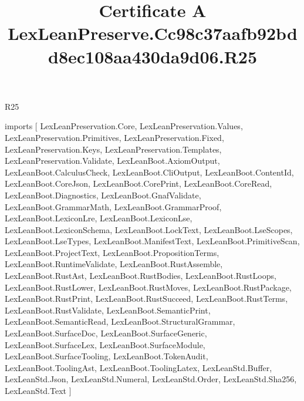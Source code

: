 \begin{lexlean}{R25}
\title{Certificate A LexLeanPreserve.Cc98c37aafb92bdd8ec108aa430da9d06.R25}
\begin{coremodule}
imports [
  LexLeanPreservation.Core,
  LexLeanPreservation.Values,
  LexLeanPreservation.Primitives,
  LexLeanPreservation.Fixed,
  LexLeanPreservation.Keys,
  LexLeanPreservation.Templates,
  LexLeanPreservation.Validate,
  LexLeanBoot.AxiomOutput,
  LexLeanBoot.CalculusCheck,
  LexLeanBoot.CliOutput,
  LexLeanBoot.ContentId,
  LexLeanBoot.CoreJson,
  LexLeanBoot.CorePrint,
  LexLeanBoot.CoreRead,
  LexLeanBoot.Diagnostics,
  LexLeanBoot.GnafValidate,
  LexLeanBoot.GrammarMath,
  LexLeanBoot.GrammarProof,
  LexLeanBoot.LexiconLre,
  LexLeanBoot.LexiconLse,
  LexLeanBoot.LexiconSchema,
  LexLeanBoot.LockText,
  LexLeanBoot.LseScopes,
  LexLeanBoot.LseTypes,
  LexLeanBoot.ManifestText,
  LexLeanBoot.PrimitiveScan,
  LexLeanBoot.ProjectText,
  LexLeanBoot.PropositionTerms,
  LexLeanBoot.RuntimeValidate,
  LexLeanBoot.RustAssemble,
  LexLeanBoot.RustAst,
  LexLeanBoot.RustBodies,
  LexLeanBoot.RustLoops,
  LexLeanBoot.RustLower,
  LexLeanBoot.RustMoves,
  LexLeanBoot.RustPackage,
  LexLeanBoot.RustPrint,
  LexLeanBoot.RustSucceed,
  LexLeanBoot.RustTerms,
  LexLeanBoot.RustValidate,
  LexLeanBoot.SemanticPrint,
  LexLeanBoot.SemanticRead,
  LexLeanBoot.StructuralGrammar,
  LexLeanBoot.SurfaceDoc,
  LexLeanBoot.SurfaceGeneric,
  LexLeanBoot.SurfaceLex,
  LexLeanBoot.SurfaceModule,
  LexLeanBoot.SurfaceTooling,
  LexLeanBoot.TokenAudit,
  LexLeanBoot.ToolingAst,
  LexLeanBoot.ToolingLatex,
  LexLeanStd.Buffer,
  LexLeanStd.Json,
  LexLeanStd.Numeral,
  LexLeanStd.Order,
  LexLeanStd.Sha256,
  LexLeanStd.Text
]


\end{coremodule}
\end{lexlean}
